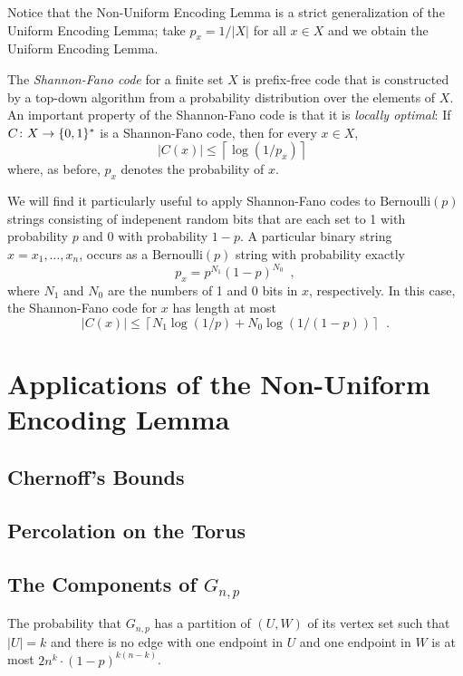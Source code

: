 \documentclass{patmorin}
\begin{document}
Notice that the Non-Uniform Encoding Lemma is a strict generalization
of the Uniform Encoding Lemma; take $p_x=1/|X|$ for all $x\in X$
and we obtain the Uniform Encoding Lemma.

The \emph{Shannon-Fano code} \cite{fano:transmission,shannon:mathematical}
for a finite set $X$ is prefix-free code that is constructed by a top-down
algorithm from a probability distribution over the elements of $X$. An
important property of the Shannon-Fano code is that it is \emph{locally
optimal}: If $C\colon X\to\{0,1\}^*$ is a Shannon-Fano code, then for every $x\in X$,
\[
    |C(x)| \le \left\lceil\log(1/p_x)\right\rceil \enspace 
\]
where, as before, $p_x$ denotes the probability of $x$.

We will find it particularly useful to apply Shannon-Fano codes to
$\mathrm{Bernoulli}(p)$ strings consisting of indepenent random bits that
are each set to 1 with probability $p$ and 0 with probability $1-p$.
A particular binary string $x=x_1,\ldots,x_n$, occurs as
a $\mathrm{Bernoulli}(p)$ string with
probability exactly
\[
   p_x= p^{N_1}(1-p)^{N_0} \enspace ,
\]
where $N_1$ and $N_0$ are the numbers of 1 and 0 bits in $x$, respectively. In this case, the Shannon-Fano code for $x$ has length at most
\[
    |C(x)|\le \left\lceil N_1\log (1/p) + N_0\log(1/(1-p)) \right\rceil \enspace .
\]


\section{Applications of the Non-Uniform Encoding Lemma}

\subsection{Chernoff's Bounds}

\subsection{Percolation on the Torus}

\subsection{The Components of $G_{n,p}$}

\begin{lem}
  The probability that $G_{n,p}$ has a partition of $(U,W)$ of its vertex
  set such that $|U|=k$ and there is no edge with one endpoint in $U$
  and one endpoint in $W$ is at most $2n^k\cdot (1-p)^{k(n-k)}$.
\end{lem}
\end{document}

